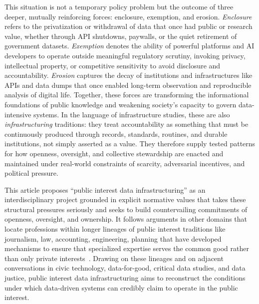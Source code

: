 \documentclass[acmsmall,screen]{acmart}
\begin{document}
This situation is not a temporary policy problem but the outcome of three deeper, mutually reinforcing forces: enclosure, exemption, and erosion. \textit{Enclosure} refers to the privatization or withdrawal of data that once had public or research value, whether through API shutdowns, paywalls, or the quiet retirement of government datasets. \textit{Exemption} denotes the ability of powerful platforms and AI developers to operate outside meaningful regulatory scrutiny, invoking privacy, intellectual property, or competitive sensitivity to avoid disclosure and accountability. \textit{Erosion} captures the decay of institutions and infrastructures like APIs and data dumps that once enabled long-term observation and reproducible analysis of digital life. Together, these forces are transforming the informational foundations of public knowledge and weakening society's capacity to govern data-intensive systems. In the language of infrastructure studies, these are also \textit{infrastructuring} traditions: they treat accountability as something that must be continuously produced through records, standards, routines, and durable institutions, not simply asserted as a value. They therefore supply tested patterns for how openness, oversight, and collective stewardship are enacted and maintained under real-world constraints of scarcity, adversarial incentives, and political pressure.

This article proposes ``public interest data infrastructuring'' as an interdisciplinary project grounded in explicit normative values that takes these structural pressures seriously and seeks to build countervailing commitments of openness, oversight, and ownership. It follows arguments in other domains that locate professions within longer lineages of public interest traditions like journalism, law, accounting, engineering, planning that have developed mechanisms to ensure that specialized expertise serves the common good rather than only private interests~\cite{washingtonDefiningPublicInterest2024}. Drawing on these lineages and on adjacent conversations in civic technology, data-for-good, critical data studies, and data justice, public interest data infrastructuring aims to reconstruct the conditions under which data-driven systems can credibly claim to operate in the public interest.
\end{document}
